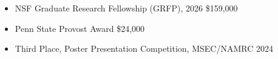 \begin{itemize}[noitemsep, topsep=0pt, partopsep=0pt, parsep=0pt]
    \item NSF Graduate Research Fellowship (GRFP), 2026 \hfill \$159,000
    \item Penn State Provost Award \hfill \$24,000
    \item Third Place, Poster Presentation Competition, MSEC/NAMRC 2024
\end{itemize}
